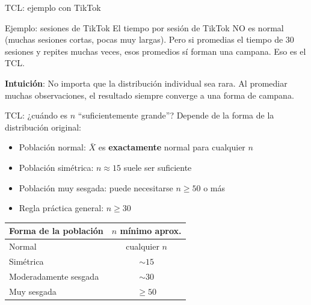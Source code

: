 \documentclass[aspectratio=169, 11pt]{beamer}
\begin{document}
\begin{frame}{TCL: ejemplo con TikTok}
\begin{exampleblock}{Ejemplo: sesiones de TikTok}
El tiempo por sesi\'on de TikTok NO es normal (muchas sesiones cortas, pocas muy largas). Pero si promedias el tiempo de 30 sesiones y repites muchas veces, esos promedios s\'i forman una campana. Eso es el TCL.
\end{exampleblock}

\vspace{0.5em}
\textbf{Intuici\'on}: No importa que la distribuci\'on individual sea rara. Al promediar muchas observaciones, el resultado siempre converge a una forma de campana.
\end{frame}

\begin{frame}{TCL: ¿cuándo es $n$ ``suficientemente grande''?}
\alert{Depende de la forma de la distribución original}:
\begin{itemize}
\item Población normal: $\bar{X}$ es \textbf{exactamente} normal para cualquier $n$
\item Población simétrica: $n \approx 15$ suele ser suficiente
\item Población muy sesgada: puede necesitarse $n \geq 50$ o más
\item Regla práctica general: $n \geq 30$
\end{itemize}

\vspace{1em}
\begin{center}
{\small
\begin{tabular}{lc}
\toprule
\textbf{Forma de la población} & \textbf{$n$ mínimo aprox.} \\
\midrule
Normal & cualquier $n$ \\
Simétrica & $\sim 15$ \\
Moderadamente sesgada & $\sim 30$ \\
Muy sesgada & $\geq 50$ \\
\bottomrule
\end{tabular}
}
\end{center}
\end{frame}
\end{document}
